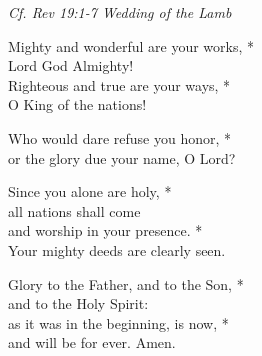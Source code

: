     \emph{\small Cf. Rev 19:1-7 Wedding of the Lamb}

    Mighty and wonderful are your works, *\\
    Lord God Almighty!\\
    Righteous and true are your ways, *\\
    O King of the nations!
    
    Who would dare refuse you honor, *\\
    or the glory due your name, O Lord?
    
    Since you alone are holy, *\\
    all nations shall come\\
    and worship in your presence. *\\
    Your mighty deeds are clearly seen.
    
    Glory to the Father, and to the Son, *\\
    and to the Holy Spirit:\\
    as it was in the beginning, is now, *\\
    and will be for ever. Amen.
